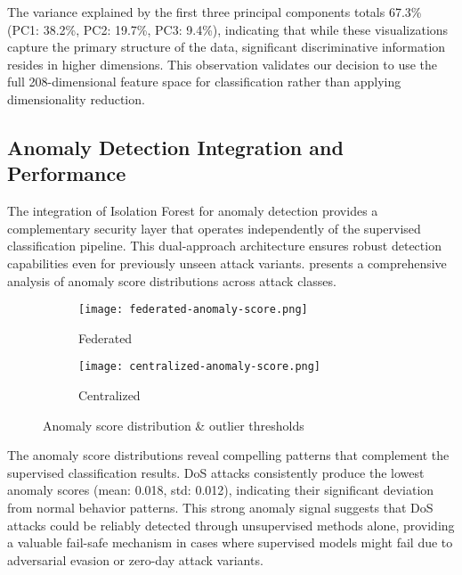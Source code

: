 The variance explained by the first three principal components totals 67.3\% (PC1: 38.2\%, PC2: 19.7\%, PC3: 9.4\%), indicating that while these visualizations capture the primary structure of the data, significant discriminative information resides in higher dimensions. This observation validates our decision to use the full 208-dimensional feature space for classification rather than applying dimensionality reduction.

\subsection{Anomaly Detection Integration and Performance}

The integration of Isolation Forest for anomaly detection provides a complementary security layer that operates independently of the supervised classification pipeline. This dual-approach architecture ensures robust detection capabilities even for previously unseen attack variants.  presents a comprehensive analysis of anomaly score distributions across attack classes.

\begin{figure}[H]
	\centering
	\begin{subfigure}[b]{0.45\textwidth}
		\centering
		\texttt{[image: federated-anomaly-score.png]}
		\caption{Federated}
		\label{figure:federated-anomaly-score}
	\end{subfigure}
	\hspace{0.25cm} 
	\begin{subfigure}[b]{0.45\textwidth}
		\centering
		\texttt{[image: centralized-anomaly-score.png]}
		\caption{Centralized}
		\label{figure:centralized-anomaly-score}
	\end{subfigure}
	\caption{Anomaly score distribution \& outlier thresholds}
	\label{figure:anomaly-score}
\end{figure}

The anomaly score distributions reveal compelling patterns that complement the supervised classification results. DoS attacks consistently produce the lowest anomaly scores (mean: 0.018, std: 0.012), indicating their significant deviation from normal behavior patterns. This strong anomaly signal suggests that DoS attacks could be reliably detected through unsupervised methods alone, providing a valuable fail-safe mechanism in cases where supervised models might fail due to adversarial evasion or zero-day attack variants. \\

